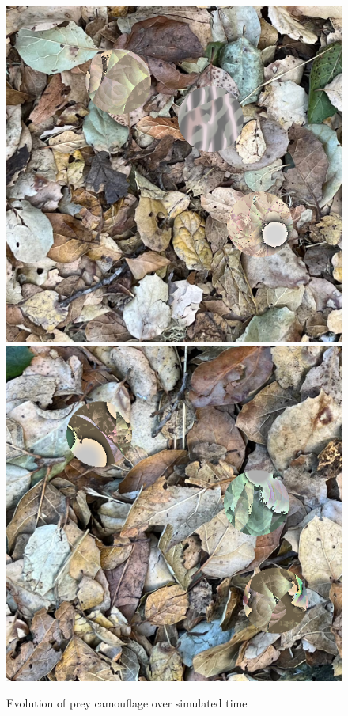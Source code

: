 \documentclass[sigconf]{acmart}
\begin{document}
\begin{figure}
    \includegraphics[scale=0.16]{images/20221030_1220_step_6650.png}
    \hfill
    \includegraphics[scale=0.16]{images/20221030_1220_step_7467.png}
    \caption{Evolution of prey camouflage over simulated time}
    \label{fig:time_sequence}
\end{figure}
\end{document}
